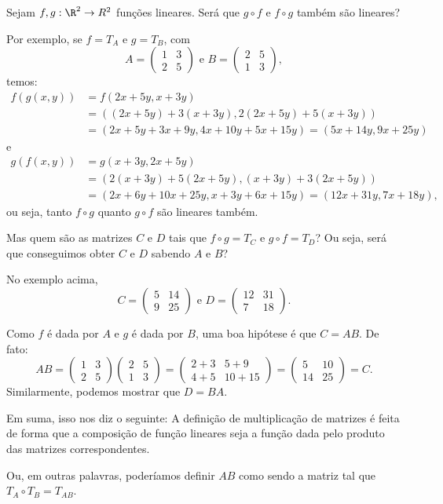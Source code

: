 \begin{ex}
	Sejam $f,g:\R^2\to R^2$ funções lineares. Será que $g\circ f$ e $f\circ g$ também são lineares?
	
	Por exemplo, se $f=T_A$ e $g=T_B$, com
	\[A=\begin{pmatrix}
	1&3\\
	2&5
	\end{pmatrix}\mbox{ e } B=\begin{pmatrix}
	2&5\\
	1&3
	\end{pmatrix},\] temos:
	\begin{align*}
		f(g(x,y))&=f(2x+5y,x+3y)\\
		&=((2x+5y)+3(x+3y),2(2x+5y)+5(x+3y))\\
		&=(2x+5y+3x+9y,4x+10y+5x+15y)=(5x+14y,9x+25y)
	\end{align*}e
	\begin{align*}
		g(f(x,y))&=g(x+3y,2x+5y)\\
		&=(2(x+3y)+5(2x+5y),(x+3y)+3(2x+5y))\\
		&=(2x+6y+10x+25y,x+3y+6x+15y)=(12x+31y,7x+18y),
	\end{align*}ou seja, tanto $f\circ g$ quanto $g\circ f$ são lineares também.
	
	Mas quem são as matrizes $C$ e $D$ tais que $f\circ g=T_C$ e $g\circ f=T_D$? Ou seja, será que conseguimos obter $C$ e $D$ sabendo $A$ e $B$?
	
	No exemplo acima, 
	\[C=\begin{pmatrix}
	5&14\\9&25
	\end{pmatrix}\mbox{ e }D=\begin{pmatrix}
	12&31\\7&18
	\end{pmatrix}.\]
	
	Como $f$ é dada por $A$ e $g$ é dada por $B$, uma boa hipótese é que $C=AB$. De fato:
	\[AB=\begin{pmatrix}
	1&3\\
	2&5
	\end{pmatrix}\begin{pmatrix}
	2&5\\
	1&3
	\end{pmatrix}=\begin{pmatrix}
	2+3&5+9\\4+5&10+15
	\end{pmatrix}=\begin{pmatrix}
	5&10\\14&25
	\end{pmatrix}=C.\] Similarmente, podemos mostrar que $D=BA$.
	
	
	Em suma, isso nos diz o seguinte: A definição de multiplicação de matrizes é feita de forma que a composição de função lineares seja a função dada pelo produto das matrizes correspondentes.
	
	Ou, em outras palavras, poderíamos definir $AB$ como sendo a matriz tal que $T_A\circ T_B=T_{AB}$.
\end{ex}

